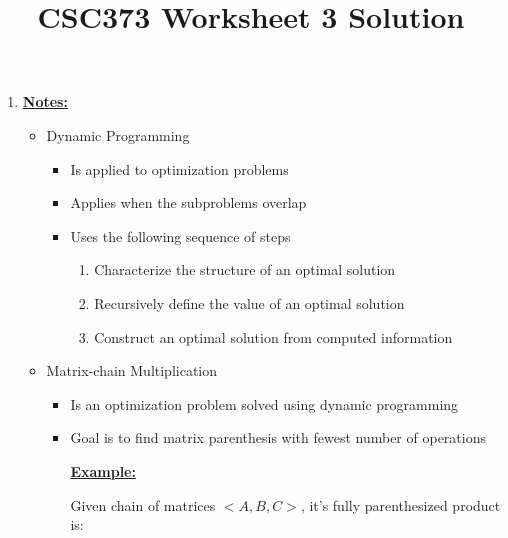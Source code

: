 \documentclass[12pt]{article}
\begin{document}
\title{CSC373 Worksheet 3 Solution}
\maketitle

\bigskip

\begin{enumerate}[1.]
    \item

    \bigskip

    \underline{\textbf{Notes:}}

    \bigskip

    \begin{itemize}
        \item Dynamic Programming

        \begin{itemize}
            \item Is applied to optimization problems
            \item Applies when the subproblems overlap
            \item Uses the following sequence of steps

            \begin{enumerate}[1.]
                \item Characterize the structure of an optimal solution
                \item Recursively define the value of an optimal solution
                \item Construct an optimal solution from computed information
            \end{enumerate}
        \end{itemize}

        \bigskip

        \item Matrix-chain Multiplication

        \begin{itemize}
            \item Is an optimization problem solved using dynamic programming
            \item Goal is to find matrix parenthesis with fewest number of operations

            \bigskip

            \underline{\textbf{Example:}}

            \bigskip

            Given chain of matrices $<A,B,C>$, it's fully parenthesized product is:


\end{itemize}
\end{itemize}
\end{enumerate}
\end{document}
